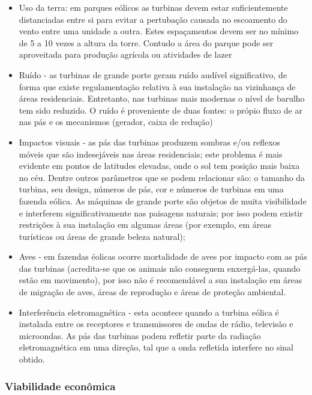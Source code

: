 \begin{itemize}
     \item Uso da terra: em parques e\'olicos as turbinas devem estar suficientemente distanciadas entre si para evitar a pertuba\c{c}\~ao causada no escoamento do vento entre uma unidade a outra. Estes espa\c{c}amentos devem ser no m\'inimo de 5 a 10 vezes a altura da torre. Contudo a \'area do parque pode ser aproveitada para produ\c{c}\~ao agr\'icola  ou atividades de lazer
     \item Ru\'ido - as turbinas de grande porte geram ru\'ido aud\'ivel significativo, de forma que existe regulamenta\c{c}\~ao relativa \`a sua instala\c{c}\~ao na vizinhan\c{c}a de \'areas residenciais. Entretanto, nas turbinas mais modernas o n\'ivel de barulho tem sido reduzido. O ru\'ido \'e proveniente de duas fontes: o pr\'opio fluxo de ar nas p\'as e os mecanismos (gerador, caixa de redu\c{c}\~ao)
     \item Impactos visuais - as p\'as das turbinas produzem sombras e/ou reflexos m\'oveis que s\~ao indesej\'aveis nas \'areas residenciais; este problema \'e mais evidente em pontos de latitudes elevadas, onde o sol tem posi\c{c}\~ao mais baixa no c\'eu. Dentre outros par\^ametros que se podem relacionar s\~ao: o tamanho da turbina, seu design, n\'umeros de p\'as, cor e n\'umeros de turbinas em uma fazenda e\'olica. As m\'aquinas de grande porte s\~ao objetos de muita visibilidade e interferem significativamente nas paisagens naturais; por isso podem existir restri\c{c}\~oes \`a sua instala\c{c}\~ao em algumas \'areas (por exemplo, em \'areas tur\'isticas ou \'areas de grande beleza natural);
	\item Aves - em fazendas \'eolicas ocorre mortalidade de aves por impacto com as p\'as das turbinas (acredita-se que os animais n\~ao conseguem enxerg\'a-las, quando est\~ao em movimento), por isso n\~ao \'e recomend\'avel a sua instala\c{c}\~ao em \'areas de migra\c{c}\~ao de aves, \'areas de reprodu\c{c}\~ao e \'areas de prote\c{c}\~ao ambiental.
        \item Interfer\^encia eletromagn\'etica - esta acontece quando a turbina e\'olica \'e instalada entre os receptores e transmissores de ondas de r\'adio, televis\~ao e microondas. As p\'as das turbinas podem refletir parte da radia\c{c}\~ao eletromagn\'etica em uma dire\c{c}\~ao, tal que a onda refletida interfere no sinal obtido.
	\end{itemize}

\subsubsection{Viabilidade econ\^omica} 

